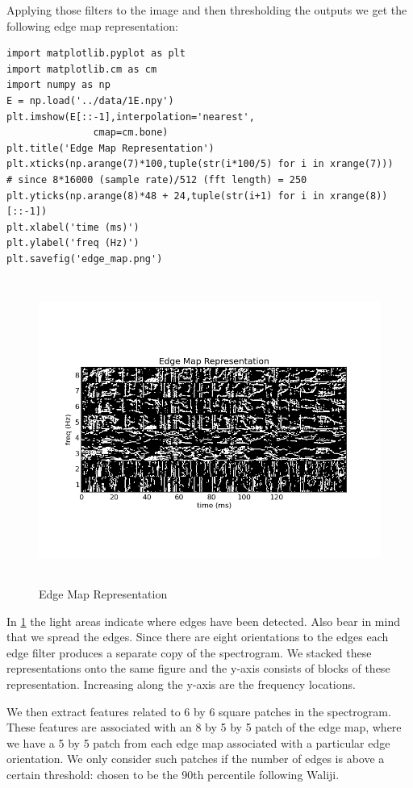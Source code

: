 \documentclass[11pt]{article}
\begin{document}
Applying those filters to the image and then thresholding the outputs
we get the following edge map representation:


\begin{verbatim}
import matplotlib.pyplot as plt
import matplotlib.cm as cm
import numpy as np
E = np.load('../data/1E.npy')
plt.imshow(E[::-1],interpolation='nearest',
               cmap=cm.bone)
plt.title('Edge Map Representation')
plt.xticks(np.arange(7)*100,tuple(str(i*100/5) for i in xrange(7)))
# since 8*16000 (sample rate)/512 (fft length) = 250
plt.yticks(np.arange(8)*48 + 24,tuple(str(i+1) for i in xrange(8))[::-1])
plt.xlabel('time (ms)')
plt.ylabel('freq (Hz)')
plt.savefig('edge_map.png')
\end{verbatim}

\begin{figure}[htb]
\centering
\includegraphics[height=10cm]{./edge_map.png}
\caption{\label{fig:edge_map}Edge Map Representation}
\end{figure}

In \ref{fig:edge_map} the light areas indicate where edges have been
detected. Also bear in mind that we spread the edges.  Since there are
eight orientations to the edges each edge filter produces a separate
copy of the spectrogram.  We stacked these representations onto the
same figure and the y-axis consists of blocks of these
representation. Increasing along the y-axis are the frequency locations.

We then extract features related to 6 by 6 square patches in the
spectrogram.  These features are associated with an 8 by 5 by 5 patch
of the edge map, where we have a 5 by 5 patch from each edge map
associated with a particular edge orientation.  We only consider such
patches if the number of edges is above a certain threshold: chosen to 
be the 90th percentile following Waliji.
\end{document}
